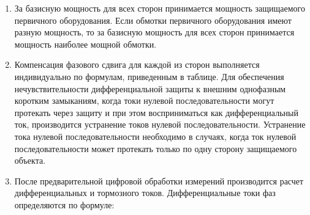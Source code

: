 \begin{enumerate}
\begin{enumerate}

\begin{equation}
\label{eq:Ibaz}
I_{\textsl{баз,N}} = \frac{S_{\textsl{баз}}}{\sqrt{3}U_{\textsl{ном,N}}},
\end{equation}


\item 
За базисную мощность для всех сторон принимается мощность защищаемого первичного 
оборудования. Если обмотки первичного оборудования имеют разную мощность, то за базисную 
мощность для всех сторон принимается мощность наиболее мощной обмотки.

\item
Компенсация фазового сдвига для каждой из сторон выполняется индивидуально по формулам, 
приведенным в таблице. Для обеспечения нечувствительности дифференциальной защиты к внешним 
однофазным коротким замыканиям, когда токи нулевой последовательности могут протекать через 
защиту и при этом восприниматься как дифференциальный ток, производится устранение токов нулевой 
последовательности. Устранение тока нулевой последовательности необходимо в случаях, когда ток 
нулевой последовательности может протекать только по одну сторону защищаемого объекта. 

\item
После предварительной цифровой обработки измерений производится расчет дифференциальных и тормозного токов. Дифференциальные токи фаз определяются по формуле:


\end{enumerate}
\end{enumerate}
